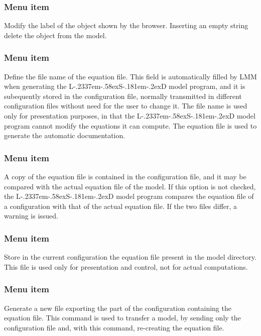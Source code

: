 \documentclass [11pt,a4paper] {book}
\def\LsD{{L\kern-.2337em\lower-.58ex\hbox{S}\kern-.181em\lower-.2ex\hbox{D}}\xspace}
\begin{document}
\subsubsection{Menu item  }
Modify the label of the object shown by the browser. Inserting an empty string delete the object from the model.

\subsubsection{Menu item  }

Define the file name of the equation file. This field is automatically filled by LMM when generating the \LsD model program, and it is subequently stored in the configuration file, normally transmitted in different configuration files without need for the user to change it. The file name is used only for presentation purposes, in that the \LsD model program cannot modify the equations it can compute. The equation file is used to generate the automatic documentation.

\subsubsection{Menu item  }

A copy of the equation file is contained in the configuration file, and it may be compared with the actual equation file of the model. If this option is not checked, the \LsD model program compares the equation file of a configuration with that of the actual equation file. If the two files differ, a warning is issued. 

\subsubsection{Menu item  }

Store in the current configuration the equation file present in the model directory. This file is used only for presentation and control, not for actual computations.


\subsubsection{Menu item  }

Generate a new file exporting the part of the configuration containing the equation file. This command is used to transfer a model, by sending only the configuration file and, with this command, re-creating the equation file.
\end{document}
